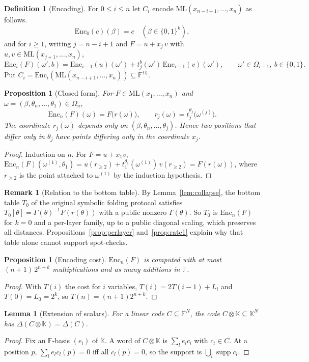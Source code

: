 \documentclass[11pt]{article}
\newtheorem{lemma}[theorem]{Lemma}
\newtheorem{proposition}[theorem]{Proposition}
\theoremstyle{definition}
\newtheorem{definition}[theorem]{Definition}
\newtheorem{remark}[theorem]{Remark}
\newcommand{\F}{\mathbb{F}}
\newcommand{\K}{\mathbb{K}}
\newcommand{\ML}{\mathrm{ML}}
\newcommand{\Enc}{\mathrm{Enc}}
\begin{document}
\begin{definition}[Encoding]\label{def:enc}
For $0\le i\le n$ let $C_i$ encode $\ML(x_{n-i+1},\dots,x_n)$ as follows.
\[
\Enc_0(c)(\beta)=c\quad(\beta\in\{0,1\}^k),
\]
and for $i\ge1$, writing $j=n-i+1$ and $F=u+x_j\,v$ with $u,v\in\ML(x_{j+1},\dots,x_n)$,
\[
\Enc_i(F)(\omega',b)=\Enc_{i-1}(u)(\omega')+t_j^b(\omega')\,\Enc_{i-1}(v)(\omega'),
\qquad \omega'\in\Omega_{i-1},\ b\in\{0,1\}.
\]
Put $C_i=\Enc_i(\ML(x_{n-i+1},\dots,x_n))\subseteq\F^{\Omega_i}$.
\end{definition}

\begin{proposition}[Closed form]\label{prop:closed}
For $F\in\ML(x_1,\dots,x_n)$ and $\omega=(\beta,\theta_n,\dots,\theta_1)\in\Omega_n$,
\[
\Enc_n(F)(\omega)=F\bigl(r(\omega)\bigr),\qquad r_j(\omega)=t_j^{\theta_j}\bigl(\omega^{(j)}\bigr).
\]
The coordinate $r_j(\omega)$ depends only on $(\beta,\theta_n,\dots,\theta_j)$. Hence two positions
that differ only in $\theta_j$ have points differing only in the coordinate $x_j$.
\end{proposition}
\begin{proof}
Induction on $n$. For $F=u+x_1v$, $\Enc_n(F)(\omega^{(1)},\theta_1)=u(r_{\ge2})+t_1^{\theta_1}(\omega^{(1)})\,v(r_{\ge2})=F(r(\omega))$,
where $r_{\ge2}$ is the point attached to $\omega^{(1)}$ by the induction hypothesis.
\end{proof}

\begin{remark}[Relation to the bottom table]
By Lemma~\ref{lem:collapse}, the bottom table $T_0$ of the original symbolic folding protocol satisfies
$T_0[\theta]=\Gamma(\theta)^{-1}F(r(\theta))$ with a public nonzero $\Gamma(\theta)$. So $T_0$ is
$\Enc_n(F)$ for $k=0$ and a per-layer family, up to a public diagonal scaling, which preserves all
distances. Propositions~\ref{prop:perlayer} and~\ref{prop:rate1} explain why that table alone
cannot support spot-checks.
\end{remark}

\begin{proposition}[Encoding cost]\label{prop:cost}
$\Enc_n(F)$ is computed with at most $(n+1)\,2^{n+k}$ multiplications and as many additions in $\F$.
\end{proposition}
\begin{proof}
With $T(i)$ the cost for $i$ variables, $T(i)=2T(i-1)+L_i$ and $T(0)=L_0=2^k$, so
$T(n)=(n+1)2^{n+k}$.
\end{proof}

\begin{lemma}[Extension of scalars]\label{lem:ext}
For a linear code $C\subseteq\F^N$, the code $C\otimes\K\subseteq\K^N$ has $\Delta(C\otimes\K)=\Delta(C)$.
\end{lemma}
\begin{proof}
Fix an $\F$-basis $(e_l)$ of $\K$. A word of $C\otimes\K$ is $\sum_le_lc_l$ with $c_l\in C$. At a
position $p$, $\sum_le_lc_l(p)=0$ iff all $c_l(p)=0$, so the support is $\bigcup_l\operatorname{supp}c_l$.
\end{proof}
\end{document}
